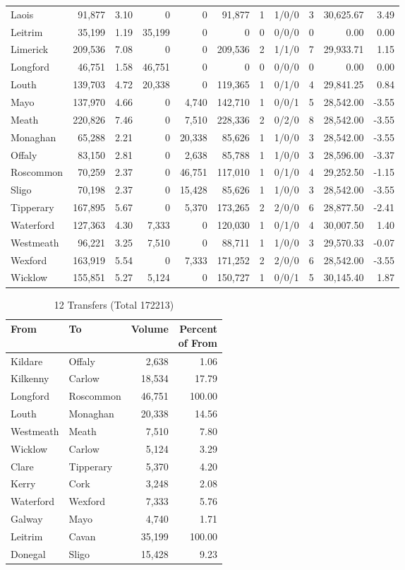 \documentclass[a4paper]{article}
\begin{document}
\begin{longtable}{lrrrrrrlrrr}
Laois&91,877& 3.10&0&0&91,877&1&1/0/0&3&30,625.67& 3.49\\ 
Leitrim&35,199& 1.19&35,199&0&0&0&0/0/0&0& 0.00& 0.00\\ 
Limerick&209,536& 7.08&0&0&209,536&2&1/1/0&7&29,933.71& 1.15\\ 
Longford&46,751& 1.58&46,751&0&0&0&0/0/0&0& 0.00& 0.00\\ 
Louth&139,703& 4.72&20,338&0&119,365&1&0/1/0&4&29,841.25& 0.84\\ 
Mayo&137,970& 4.66&0&4,740&142,710&1&0/0/1&5&28,542.00&-3.55\\ 
Meath&220,826& 7.46&0&7,510&228,336&2&0/2/0&8&28,542.00&-3.55\\ 
Monaghan&65,288& 2.21&0&20,338&85,626&1&1/0/0&3&28,542.00&-3.55\\ 
Offaly&83,150& 2.81&0&2,638&85,788&1&1/0/0&3&28,596.00&-3.37\\ 
Roscommon&70,259& 2.37&0&46,751&117,010&1&0/1/0&4&29,252.50&-1.15\\ 
Sligo&70,198& 2.37&0&15,428&85,626&1&1/0/0&3&28,542.00&-3.55\\ 
Tipperary&167,895& 5.67&0&5,370&173,265&2&2/0/0&6&28,877.50&-2.41\\ 
Waterford&127,363& 4.30&7,333&0&120,030&1&0/1/0&4&30,007.50& 1.40\\ 
Westmeath&96,221& 3.25&7,510&0&88,711&1&1/0/0&3&29,570.33&-0.07\\ 
Wexford&163,919& 5.54&0&7,333&171,252&2&2/0/0&6&28,542.00&-3.55\\ 
Wicklow&155,851& 5.27&5,124&0&150,727&1&0/0/1&5&30,145.40& 1.87\\ 
\end{longtable}

\begin{table}[htbp]
\caption{12 Transfers (Total 172213)}
\centering
\begin{tabular}{llrr} \toprule
From &To &Volume &\shortstack{Percent\\of From} \\ \midrule
Kildare&Offaly&2,638& 1.06\\ 
Kilkenny&Carlow&18,534&17.79\\ 
Longford&Roscommon&46,751&100.00\\ 
Louth&Monaghan&20,338&14.56\\ 
Westmeath&Meath&7,510& 7.80\\ 
Wicklow&Carlow&5,124& 3.29\\ 
Clare&Tipperary&5,370& 4.20\\ 
Kerry&Cork&3,248& 2.08\\ 
Waterford&Wexford&7,333& 5.76\\ 
Galway&Mayo&4,740& 1.71\\ 
Leitrim&Cavan&35,199&100.00\\ 
Donegal&Sligo&15,428& 9.23\\ 
\bottomrule
\end{tabular}
\end{table}
\end{document}

